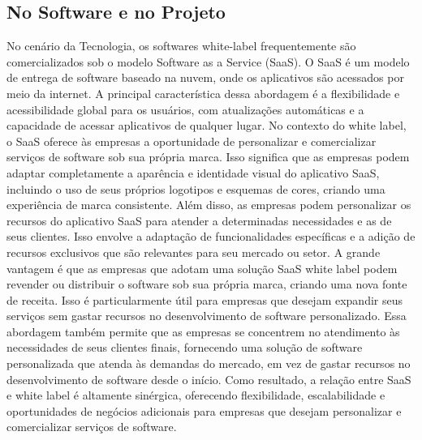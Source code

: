 \documentclass[12pt,twoside,english,brazilian]{article}
\begin{document}
\subsection{No Software e no Projeto}
No cenário da Tecnologia, os softwares white-label frequentemente são comercializados sob o modelo Software as a Service (SaaS). O SaaS é um modelo de entrega de software baseado na nuvem, onde os aplicativos são acessados por meio da internet. A principal característica dessa abordagem é a flexibilidade e acessibilidade global para os usuários, com atualizações automáticas e a capacidade de acessar aplicativos de qualquer lugar. No contexto do white label, o SaaS oferece às empresas a oportunidade de personalizar e comercializar serviços de software sob sua própria marca. Isso significa que as empresas podem adaptar completamente a aparência e identidade visual do aplicativo SaaS, incluindo o uso de seus próprios logotipos e esquemas de cores, criando uma experiência de marca consistente.
Além disso, as empresas podem personalizar os recursos do aplicativo SaaS para atender a determinadas necessidades e as de seus clientes. Isso envolve a adaptação de funcionalidades específicas e a adição de recursos exclusivos que são relevantes para seu mercado ou setor. A grande vantagem é que as empresas que adotam uma solução SaaS white label podem revender ou distribuir o software sob sua própria marca, criando uma nova fonte de receita. Isso é particularmente útil para empresas que desejam expandir seus serviços sem gastar recursos no desenvolvimento de software personalizado.
Essa abordagem também permite que as empresas se concentrem no atendimento às necessidades de seus clientes finais, fornecendo uma solução de software personalizada que atenda às demandas do mercado, em vez de gastar recursos no desenvolvimento de software desde o início. Como resultado, a relação entre SaaS e white label é altamente sinérgica, oferecendo flexibilidade, escalabilidade e oportunidades de negócios adicionais para empresas que desejam personalizar e comercializar serviços de software.
\end{document}
